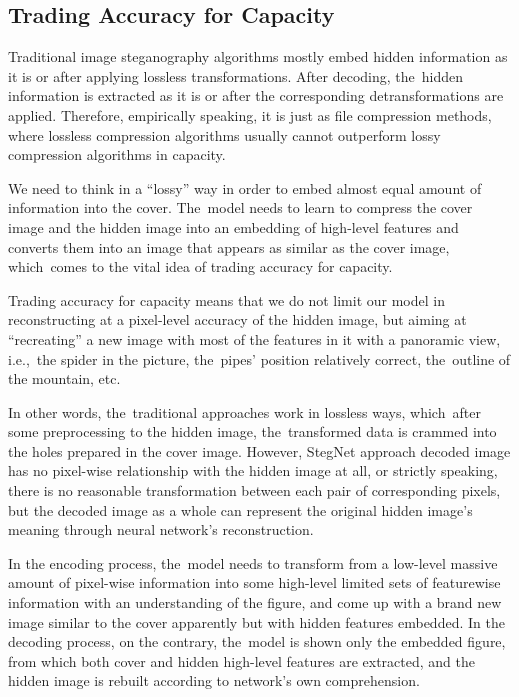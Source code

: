 \documentclass[futureinternet,article,accept,moreauthors,pdftex,10pt,a4paper]{Definitions/mdpi}
\begin{document}
\subsection{Trading Accuracy for Capacity}%
\label{ssec:tradingaccforcap}

Traditional image steganography algorithms mostly embed hidden information as it is or after applying lossless transformations. After decoding, the~hidden information is extracted as it is or after the corresponding detransformations are applied. Therefore, empirically speaking, it is just as file compression methods, where lossless compression algorithms usually cannot outperform lossy compression algorithms in capacity.

We need to think in a ``lossy'' way in order to embed almost equal amount of information into the cover. The~model needs to learn to compress the cover image and the hidden image into an embedding of high-level features and converts them into an image that appears as similar as the cover image, which~comes to the vital idea of trading accuracy for capacity.

Trading accuracy for capacity means that we do not limit our model in reconstructing at a pixel-level accuracy of the hidden image, but aiming at ``recreating'' a new image with most of the features in it with a panoramic view, i.e.,\ the spider in the picture, the~pipes' position relatively correct, the~outline of the mountain, etc.

In other words, the~traditional approaches work in lossless ways, which~after some preprocessing to the hidden image, the~transformed data is crammed into the holes prepared in the cover image. However, StegNet approach decoded image has no pixel-wise relationship with the hidden image at all, or strictly speaking, there is no reasonable transformation between each pair of corresponding pixels, but the decoded image as a whole can represent the original hidden image's meaning through neural network's reconstruction.

In the encoding process, the~model needs to transform from a low-level massive amount of pixel-wise information into some high-level limited sets of featurewise information with an understanding of the figure, and come up with a brand new image similar to the cover apparently but with hidden features embedded. In the decoding process, on the contrary, the~model is shown only the embedded figure, from which both cover and hidden high-level features are extracted, and the hidden image is rebuilt according to network's own comprehension.
\end{document}
